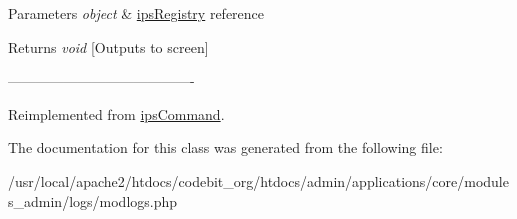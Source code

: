 \begin{DoxyParams}{Parameters}
{\em object} & \hyperlink{classips_registry}{ips\-Registry} reference \\
\hline
\end{DoxyParams}
\begin{DoxyReturn}{Returns}
{\itshape void} \mbox{[}Outputs to screen\mbox{]} 
\end{DoxyReturn}
----------------------------------------\/ 

Reimplemented from \hyperlink{classips_command_afbc4e912a0604b94d47d66744c64d8ba}{ips\-Command}.



The documentation for this class was generated from the following file\-:\begin{DoxyCompactItemize}
\item 
/usr/local/apache2/htdocs/codebit\-\_\-org/htdocs/admin/applications/core/modules\-\_\-admin/logs/modlogs.\-php\end{DoxyCompactItemize}
